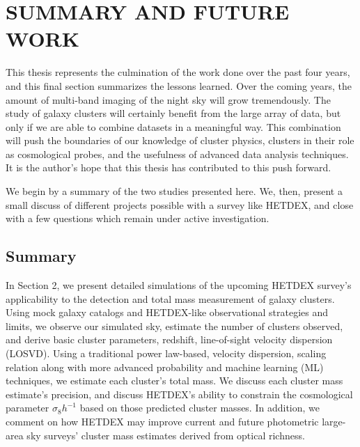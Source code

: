 %
%
%



\chapter[\uppercase{Summary and Future Work}]{\uppercase{Summary and Future Work}}

This thesis represents the culmination of the work done over the past four years, and this final section summarizes the lessons learned. Over the coming years, the amount of multi-band imaging of the night sky will grow tremendously. The study of galaxy clusters will certainly benefit from the large array of data, but only if we are able to combine datasets in a meaningful way. This combination will push the boundaries of our knowledge of cluster physics, clusters in their role as cosmological probes, and the usefulness of advanced data analysis techniques. It is the author's hope that this thesis has contributed to this push forward. 

We begin by a summary of the two studies presented here. We, then, present a small discuss of different projects possible with a survey like HETDEX, and close with a few questions which remain under active investigation.

\section{Summary}\label{sec:summary} 
In Section 2, we present detailed simulations of the upcoming HETDEX survey's applicability to the detection and total mass measurement of galaxy clusters. Using mock galaxy catalogs and HETDEX-like observational strategies and limits, we observe our simulated sky, estimate the number of clusters observed, and derive basic cluster parameters, redshift, line-of-sight velocity dispersion (LOSVD). Using a traditional power law-based, velocity dispersion, scaling relation along with more advanced probability and machine learning (ML) techniques, we estimate each cluster's total mass. We discuss each cluster mass estimate's precision, and discuss HETDEX's ability to constrain the cosmological parameter $\sigma_8 h^{-1}$ based on those predicted cluster masses. In addition, we comment on how HETDEX may improve current and future photometric large-area sky surveys' cluster mass estimates derived from optical richness.

